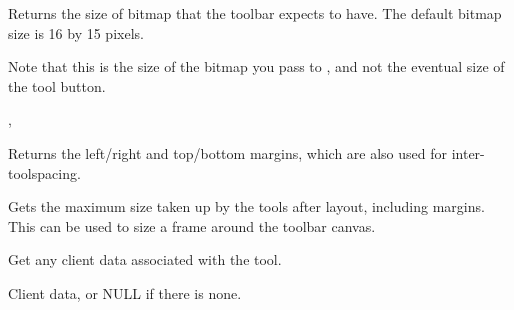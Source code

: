 Returns the size of bitmap that the toolbar expects to have. The default bitmap size is 16 by 15 pixels.


Note that this is the size of the bitmap you pass to ,
and not the eventual size of the tool button.


,\rtfsp
{}

\label{wxtoolbarbasegetmargins}


Returns the left/right and top/bottom margins, which are also used for inter-toolspacing.



\label{wxtoolbarbasegetmaxsize}


Gets the maximum size taken up by the tools after layout, including margins.
This can be used to size a frame around the toolbar canvas.




\label{wxtoolbarbasegettoolclientdata}


Get any client data associated with the tool.




Client data, or NULL if there is none.

\label{wxtoolbarbasegettoolenabled}

